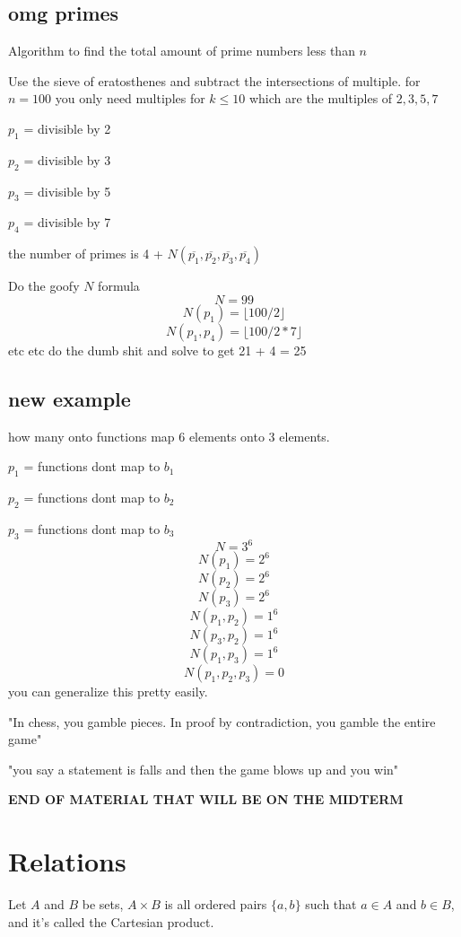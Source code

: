 \documentclass{report}
\begin{document}
\section{omg primes}
Algorithm to find the total amount of prime numbers less than $n$

Use the sieve of eratosthenes and subtract the intersections of multiple.
for $n = 100$ you only need multiples for $k \leq 10$ which are the multiples of $2, 3, 5, 7$

$p_1$ = divisible by 2

$p_2$ = divisible by 3

$p_3$ = divisible by 5

$p_4$ = divisible by 7

the number of primes is 4 + $N(\overline{p_1}, \overline{p_2}, \overline{p_3}, \overline{p_4})$

Do the goofy $N$ formula
\[
N = 99
\]
\[
N(p_1) = \lfloor 100/2 \rfloor
\]
\[
N(p_1, p_4) = \lfloor 100/2*7 \rfloor
\]
etc etc do the dumb shit and solve to get 21 + 4 = 25



\section{new example}
how many onto functions map 6 elements onto 3 elements.

$p_1$ = functions dont map to $b_1$

$p_2$ = functions dont map to $b_2$

$p_3$ = functions dont map to $b_3$
\[
N = 3^6
\]
\[
N(p_1) = 2^6
\]
\[
N(p_2) = 2^6
\]
\[
N(p_3) = 2^6
\]
\[
N(p_1, p_2) = 1^6
\]
\[
N(p_3, p_2) = 1^6
\]
\[
N(p_1, p_3) = 1^6
\]
\[
N(p_1, p_2, p_3) = 0
\]
you can generalize this pretty easily.




"In chess, you gamble pieces. In proof by contradiction, you gamble the entire game"

"you say a statement is falls and then the game blows up and you win"
\begin{center}
\textbf{ END OF MATERIAL THAT WILL BE ON THE MIDTERM}
\end{center}




\chapter{Relations}
Let $A$ and $B$ be sets, $A \times B$ is all ordered pairs $\{ a, b \}$ such that $a \in A$ and $b \in B$, and it's called the Cartesian product.
\end{document}
